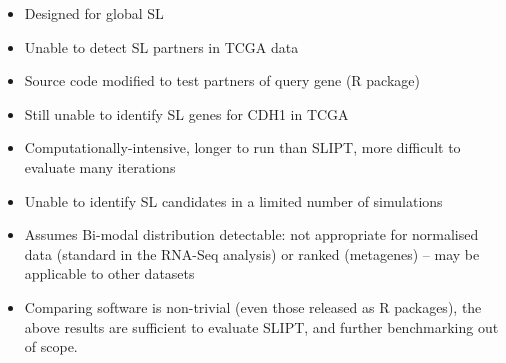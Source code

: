 \begin{itemize}
 \item Designed for global SL
 \item Unable to detect SL partners in \gls{TCGA} data
 \item Source code modified to test partners of query gene (R package)
 \item Still unable to identify SL genes for CDH1 in TCGA
 \item Computationally-intensive, longer to run than SLIPT, more difficult to evaluate many iterations
 \item Unable to identify SL candidates in a limited number of simulations
 \item Assumes Bi-modal distribution detectable: not appropriate for normalised  data (standard in the \gls{RNA-Seq} analysis) or ranked (metagenes) -- may be applicable to other datasets
 \item Comparing software is non-trivial (even those released as R packages), the above results are sufficient to evaluate \gls{SLIPT}, and further benchmarking out of scope.
\end{itemize}

\label{chapt5:compare_compute_time}
\fi


\iffalse
\begin{itemize}
 \item ChiSQ
 \item SLIPT
 \item Correlation
 \item BiSEp
 \item LM/GLM
\end{itemize}


\subsubsection{Testing Synthetic Lethal Genes with Linear Models}
\label{chapt5:compare_linear_model}
[Move to future Dir??]

\begin{itemize}
 \item Strategy to detect SL with linear models by fit to curve (significance) and slope (direction)
 \item Amenable to conditioning on known SL or iterative conditioning on strongest SL to detect other partners of higher-order SL
 \item All attempts: linear, GLM, and linear polynomial (quadratic, cubic, or quintic) underperform \gls{SLIPT}, similar to Pearson correlation results
 \item Linear models and regression may still be an avenue for further detection of SL (e.g., with Bayes)
\end{itemize}
\fi

